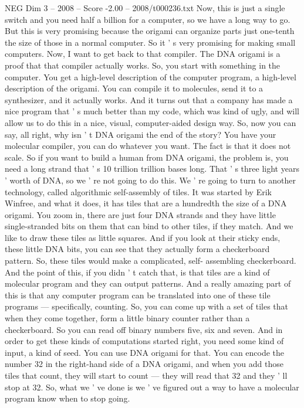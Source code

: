 \begin{textsample}{NEG Dim 3 – 2008 – Score -2.00 – 2008/t000236.txt}
Now, this is just a single switch and you need half a billion for a computer, so we have a long way to go.
But this is very promising because the origami can organize parts just one-tenth the size of those in a normal computer.
So it ' s very promising for making small computers.
Now, I want to get back to that compiler.
The DNA origami is a proof that that compiler actually works.
So, you start with something in the computer.
You get a high-level description of the computer program, a high-level description of the origami.
You can compile it to molecules, send it to a synthesizer, and it actually works.
And it turns out that a company has made a nice program that ' s much better than my code, which was kind of ugly, and will allow us to do this in a nice, visual, computer-aided design way.
So, now you can say, all right, why isn ' t DNA origami the end of the story?
You have your molecular compiler, you can do whatever you want.
The fact is that it does not scale.
So if you want to build a human from DNA origami, the problem is, you need a long strand that ' s 10 trillion trillion bases long.
That ' s three light years ' worth of DNA, so we ' re not going to do this.
We ' re going to turn to another technology, called algorithmic self-assembly of tiles.
It was started by Erik Winfree, and what it does, it has tiles that are a hundredth the size of a DNA origami.
You zoom in, there are just four DNA strands and they have little single-stranded bits on them that can bind to other tiles, if they match.
And we like to draw these tiles as little squares.
And if you look at their sticky ends, these little DNA bits, you can see that they actually form a checkerboard pattern.
So, these tiles would make a complicated, self- assembling checkerboard.
And the point of this, if you didn ' t catch that, is that tiles are a kind of molecular program and they can output patterns.
And a really amazing part of this is that any computer program can be translated into one of these tile programs — specifically, counting.
So, you can come up with a set of tiles that when they come together, form a little binary counter rather than a checkerboard.
So you can read off binary numbers five, six and seven.
And in order to get these kinds of computations started right, you need some kind of input, a kind of seed.
You can use DNA origami for that.
You can encode the number 32 in the right-hand side of a DNA origami, and when you add those tiles that count, they will start to count — they will read that 32 and they ' ll stop at 32.
So, what we ' ve done is we ' ve figured out a way to have a molecular program know when to stop going.

\end{textsample}
